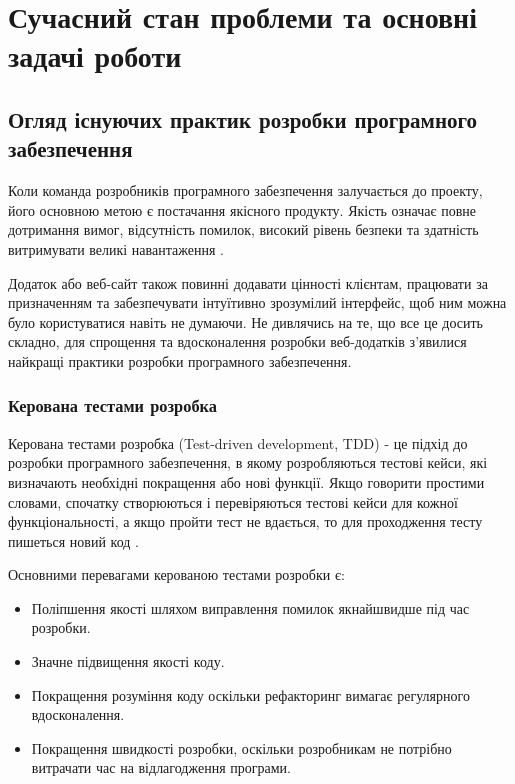 \section{Сучасний стан проблеми та основні задачі роботи}

\subsection{Огляд існуючих практик розробки програмного забезпечення}

Коли команда розробників програмного забезпечення залучається до проекту,
його основною метою є постачання якісного продукту.
Якість означає повне дотримання вимог, відсутність помилок, високий рівень безпеки 
та здатність витримувати великі навантаження \cite{tdd-bdd-article}.

Додаток або веб-сайт також повинні додавати цінності клієнтам,
працювати за призначенням та забезпечувати інтуїтивно зрозумілий інтерфейс,
щоб ним можна було користуватися навіть не думаючи. Не дивлячись на те,
що все це досить складно, для спрощення та вдосконалення розробки веб-додатків з’явилися
найкращі практики розробки програмного забезпечення.

\subsubsection{Керована тестами розробка}

Керована тестами розробка (Test-driven development, TDD) 
- це підхід до розробки програмного забезпечення,
в якому розробляються тестові кейси, які визначають необхідні покращення або нові функції.
Якщо говорити простими словами, спочатку створюються і перевіряються тестові кейси
для кожної функціональності, а якщо пройти тест не вдається,
то для проходження тесту пишеться новий код \cite{tdd-article}.

Основними перевагами керованою тестами розробки є:

\begin{itemize}
		\item Поліпшення якості шляхом виправлення помилок якнайшвидше під час розробки.
		\item Значне підвищення якості коду.
		\item Покращення розуміння коду оскільки рефакторинг
			вимагає регулярного вдосконалення.
		\item Покращення швидкості розробки, оскільки розробникам
			не потрібно витрачати час на відлагодження програми.
\end{itemize}


